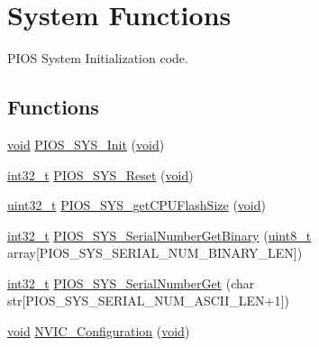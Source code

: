 \hypertarget{group___p_i_o_s___s_y_s}{\section{System Functions}
\label{group___p_i_o_s___s_y_s}
}


P\-I\-O\-S System Initialization code.  


\subsection*{Functions}
\begin{DoxyCompactItemize}
\item 
\hyperlink{group___n_a_m_e_ga18028b8badbf1ea7e704ccac3c488e82}{void} \hyperlink{group___p_i_o_s___s_y_s_gaec647868ac486506b195fa5272cbdb92}{P\-I\-O\-S\-\_\-\-S\-Y\-S\-\_\-\-Init} (\hyperlink{group___n_a_m_e_ga18028b8badbf1ea7e704ccac3c488e82}{void})
\item 
\hyperlink{group___n_a_m_e_gafd12020da5a235dfcf0c3c748fb5baed}{int32\-\_\-t} \hyperlink{group___p_i_o_s___s_y_s_ga2acb35c64cd66c4e731cea5a2c855de0}{P\-I\-O\-S\-\_\-\-S\-Y\-S\-\_\-\-Reset} (\hyperlink{group___n_a_m_e_ga18028b8badbf1ea7e704ccac3c488e82}{void})
\item 
\hyperlink{stdint_8h_a435d1572bf3f880d55459d9805097f62}{uint32\-\_\-t} \hyperlink{group___p_i_o_s___s_y_s_gab274e5bc3b8d70ca08701eb04f783bc3}{P\-I\-O\-S\-\_\-\-S\-Y\-S\-\_\-get\-C\-P\-U\-Flash\-Size} (\hyperlink{group___n_a_m_e_ga18028b8badbf1ea7e704ccac3c488e82}{void})
\item 
\hyperlink{group___n_a_m_e_gafd12020da5a235dfcf0c3c748fb5baed}{int32\-\_\-t} \hyperlink{group___p_i_o_s___s_y_s_ga2e1f3aaafed672c51239e5a84d752b1f}{P\-I\-O\-S\-\_\-\-S\-Y\-S\-\_\-\-Serial\-Number\-Get\-Binary} (\hyperlink{stdint_8h_aba7bc1797add20fe3efdf37ced1182c5}{uint8\-\_\-t} array\mbox{[}P\-I\-O\-S\-\_\-\-S\-Y\-S\-\_\-\-S\-E\-R\-I\-A\-L\-\_\-\-N\-U\-M\-\_\-\-B\-I\-N\-A\-R\-Y\-\_\-\-L\-E\-N\mbox{]})
\item 
\hyperlink{group___n_a_m_e_gafd12020da5a235dfcf0c3c748fb5baed}{int32\-\_\-t} \hyperlink{group___p_i_o_s___s_y_s_ga06a0b401f67617fc771fa8b32d43e7da}{P\-I\-O\-S\-\_\-\-S\-Y\-S\-\_\-\-Serial\-Number\-Get} (char str\mbox{[}P\-I\-O\-S\-\_\-\-S\-Y\-S\-\_\-\-S\-E\-R\-I\-A\-L\-\_\-\-N\-U\-M\-\_\-\-A\-S\-C\-I\-I\-\_\-\-L\-E\-N+1\mbox{]})
\item 
\hyperlink{group___n_a_m_e_ga18028b8badbf1ea7e704ccac3c488e82}{void} \hyperlink{group___p_i_o_s___s_y_s_ga5c12343e267ace8587309499bea6babe}{N\-V\-I\-C\-\_\-\-Configuration} (\hyperlink{group___n_a_m_e_ga18028b8badbf1ea7e704ccac3c488e82}{void})

\end{DoxyCompactItemize}
